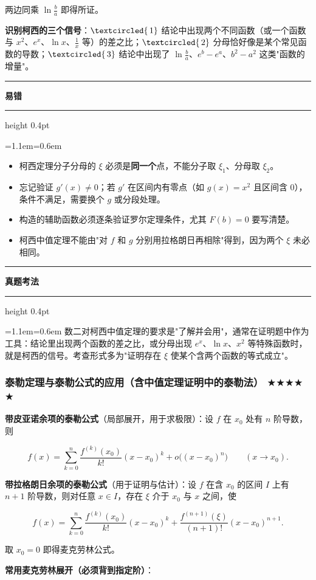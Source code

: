\documentclass[11pt,openany,UTF8]{ctexbook}
\newcommand{\circled}[1]{\textcircled{\scriptsize\,#1}}
\newcommand{\callouthead}[2]{%
  \par\addvspace{7pt}\noindent
  {\color{#1}\rule[-0.15em]{3pt}{1.05em}}\hspace{0.5em}%
  {\bfseries\color{#1}#2}\par\nobreak\vspace{-0.35em}%
  {\color{rulesep}\hrule height 0.4pt}\nobreak\vspace{0.45em}%
  \begingroup\small\setlength{\parindent}{0pt}%
  \leftskip=1.1em\rightskip=0.6em\noindent\ignorespaces}
\newcommand{\calloutend}{\par\endgroup\addvspace{7pt}}
\newenvironment{callwarn}[1]{\callouthead{warnbar}{#1}}{\calloutend}
\newenvironment{callexam}[1]{\callouthead{exambar}{#1}}{\calloutend}
\begin{document}
两边同乘 $\ln\frac ba$ 即得所证。

\textbf{识别柯西的三个信号}：$\circled{1}$ 结论中出现两个不同函数（或一个函数与 $x^2$、$e^x$、$\ln x$、$\frac1x$ 等）的差之比；$\circled{2}$ 分母恰好像是某个常见函数的导数；$\circled{3}$ 结论中出现了 $\ln\frac ba$、$e^b-e^a$、$b^2-a^2$ 这类"函数的增量"。

\begin{callwarn}{易错}
\begin{itemize}
\item 柯西定理分子分母的 $\xi$ 必须是\textbf{同一个}点，不能分子取 $\xi_1$、分母取 $\xi_2$。
\item 忘记验证 $g'(x)\ne0$；若 $g'$ 在区间内有零点（如 $g(x)=x^2$ 且区间含 0），条件不满足，需要换个 $g$ 或分段处理。
\item 构造的辅助函数必须逐条验证罗尔定理条件，尤其 $F(b)=0$ 要写清楚。
\item 柯西中值定理不能由"对 $f$ 和 $g$ 分别用拉格朗日再相除"得到，因为两个 $\xi$ 未必相同。
\end{itemize}
\end{callwarn}

\begin{callexam}{真题考法}
数二对柯西中值定理的要求是"了解并会用"，通常在证明题中作为工具：结论里出现两个函数的差之比，或分母出现 $e^x$、$\ln x$、$x^2$ 等特殊函数时，就是柯西的信号。考查形式多为"证明存在 $\xi$ 使某个含两个函数的等式成立"。

\end{callexam}

\subsubsection{泰勒定理与泰勒公式的应用（含中值定理证明中的泰勒法） $\bigstar$$\bigstar$$\bigstar$$\bigstar$$\bigstar$}

\textbf{带皮亚诺余项的泰勒公式}（局部展开，用于求极限）：设 $f$ 在 $x_0$ 处有 $n$ 阶导数，则

\[f(x)=\sum_{k=0}^{n}\frac{f^{(k)}(x_0)}{k!}(x-x_0)^k+o\big((x-x_0)^n\big)\qquad(x\to x_0).\]

\textbf{带拉格朗日余项的泰勒公式}（用于证明与估计）：设 $f$ 在含 $x_0$ 的区间 $I$ 上有 $n+1$ 阶导数，则对任意 $x\in I$，存在 $\xi$ 介于 $x_0$ 与 $x$ 之间，使

\[f(x)=\sum_{k=0}^{n}\frac{f^{(k)}(x_0)}{k!}(x-x_0)^k+\frac{f^{(n+1)}(\xi)}{(n+1)!}(x-x_0)^{n+1}.\]

取 $x_0=0$ 即得麦克劳林公式。

\textbf{常用麦克劳林展开（必须背到指定阶）}：
\end{document}

